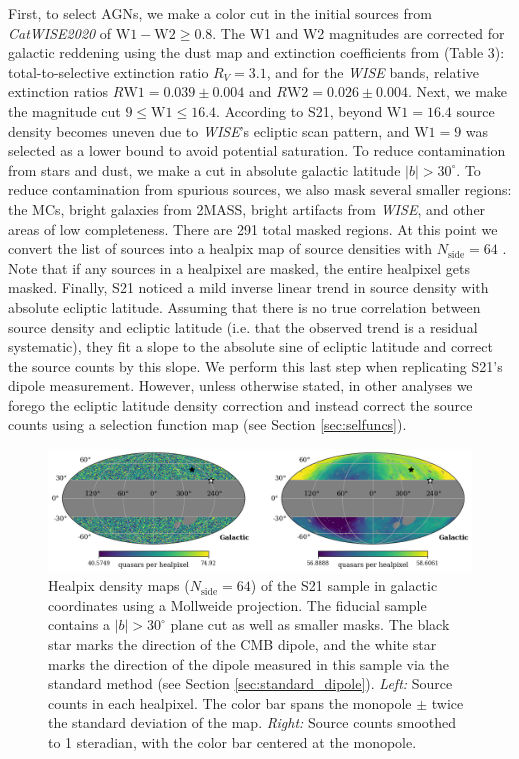 \documentclass[modern]{aastex631}
\newcommand{\catwisetwentytwenty}{\textsl{CatWISE2020}\xspace}
\newcommand{\wise}{\textsl{WISE}\xspace}
\newcommand{\w}{\mathrm{W}}
\newcommand{\nside}{N_\mathrm{side}}
\begin{document}
First, to select AGNs, we make a color cut in the initial sources from \catwisetwentytwenty of $\w 1-\w 2\geq0.8$.
The W1 and W2 magnitudes are corrected for galactic reddening using the \citet{planck_collaboration_planck_2014} dust map and extinction coefficients from \citet{wang_optical_2019} (Table 3): total-to-selective extinction ratio $R_V=3.1$, and for the \wise bands, relative extinction ratios $R\w 1=0.039\pm 0.004$ and $R\w 2=0.026\pm 0.004$.
Next, we make the magnitude cut $9\leq\w 1\leq 16.4$. According to S21, beyond $\w 1=16.4$ source density becomes uneven due to \wise's ecliptic scan pattern, and $\w 1=9$ was selected as a lower bound to avoid potential saturation.
To reduce contamination from stars and dust, we make a cut in absolute galactic latitude $\vert b\vert > 30^\circ$.
To reduce contamination from spurious sources, we also mask several smaller regions: the MCs, bright galaxies from 2MASS, bright artifacts from \wise, and other areas of low completeness.
There are 291 total masked regions.
At this point we convert the list of sources into a healpix map of source densities with $N_\mathrm{side}=64$ \citep{gorski_healpix_2005}.
Note that if any sources in a healpixel are masked, the entire healpixel gets masked.
Finally, S21 noticed a mild inverse linear trend in source density with absolute ecliptic latitude.
Assuming that there is no true correlation between source density and ecliptic latitude (i.e. that the observed trend is a residual systematic), they fit a slope to the absolute sine of ecliptic latitude and correct the source counts by this slope.
We perform this last step when replicating S21's dipole measurement.
However, unless otherwise stated, in other analyses we forego the ecliptic latitude density correction and instead correct the source counts using a selection function map (see Section \ref{sec:selfuncs}).

\begin{figure}
    \centering
    \includegraphics[width=\textwidth]{images/catwise_map.png}
    \caption{Healpix density maps ($\nside=64$) of the S21 sample in galactic coordinates using a Mollweide projection. The fiducial sample contains a $|b|>30^\circ$ plane cut as well as smaller masks. The black star marks the direction of the CMB dipole, and the white star marks the direction of the dipole measured in this sample via the standard method (see Section \ref{sec:standard_dipole}). \textit{Left:} Source counts in each healpixel. The color bar spans the monopole $\pm$ twice the standard deviation of the map. \textit{Right:} Source counts smoothed to 1 steradian, with the color bar centered at the monopole.}
    \label{fig:S21_map}
\end{figure}
\end{document}
